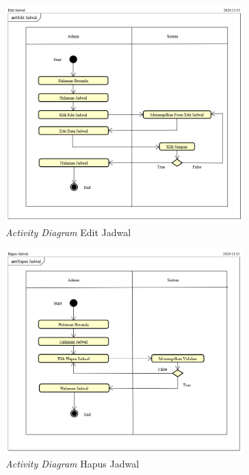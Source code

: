 \begin{figure}
	\centering
	\includegraphics[width=0.82\textwidth]{konten/gambar/activity-diagram/edit-jadwal.png}
	\caption{\textit{Activity Diagram} Edit Jadwal}
	\label{activity-diagram-edit-jadwal}
\end{figure}

\begin{figure}
	\centering
	\includegraphics[width=0.82\textwidth]{konten/gambar/activity-diagram/hapus-jadwal.png}
	\caption{\textit{Activity Diagram} Hapus Jadwal}
	\label{activity-diagram-hapus-jadwal}
\end{figure}

